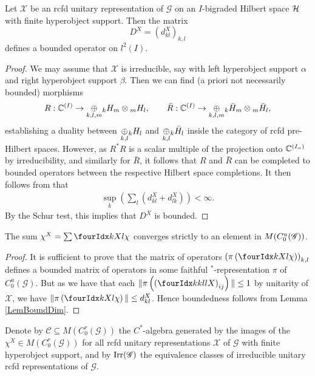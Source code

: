  \begin{Lem} \label{LemBoundDim} Let $\mathscr{X}$ be an rcfd unitary
   representation of $\mathscr{G}$ on an $I$-bigraded Hilbert space $\Hsp$ with finite hyperobject support. Then the matrix \[D^X = (d^X_{kl})_{k,l}\] defines a bounded operator on $l^2(I)$. 
  \end{Lem}
  \begin{proof} We may assume that $\mathscr{X}$ is irreducible, say
    with left hyperobject support $\alpha$ and right hyperobject support
    $\beta$. Then we can find (a priori not necessarily bounded)
    morphisms \[R: \C^{(I)}\rightarrow \underset{k,l,m}{\oplus} \GrDA{H}{k}{m}\otimes
    \GrDA{H}{m}{l},\qquad \bar{R}: \C^{(I)} \rightarrow \underset{k,l,m}{\oplus}
    \GrDA{\bar{H}}{k}{m}\otimes \GrDA{\bar{H}}{m}{l},\] establishing a
    duality between $\underset{k,l}{\oplus} \GrDA{H}{k}{l}$ and
    $\underset{k,l}{\oplus}\GrDA{\bar{H}}{k}{l}$ inside the category of
    rcfd pre-Hilbert spaces. However, as $R^*R$ is a scalar multiple
    of the projection onto $\C^{(I_{\alpha})}$ by irreducibility, and
    similarly for $\bar{R}$, it follows that $R$ and $\bar{R}$ can be
    completed to bounded operators between the respective Hilbert
    space completions. It then follows from \cite[Lemma A.3.2]{DCY1}
    that 
    \begin{align} \label{eq:dim-estimate}
  \sup_k (\sum_l (d_{kl}^X+d_{lk}^X)) < \infty.    
    \end{align}
 By the Schur test,
    this implies that $D^X$ is bounded.
\end{proof} 


   
\begin{Lem} The sum $\chi^X  =\sum \Gr{\chi}{}{X}{k}{l}$ converges strictly to an element in $M(\CuG)$. 
\end{Lem} 
 
\begin{proof} It is sufficient to prove that the matrix of operators $\left(\pi\left(\Gr{\chi}{}{X}{k}{l}\right)\right)_{k,l}$ defines a bounded matrix of operators in some faithful $^*$-representation $\pi$ of $C^{u}_{0}(\mathscr{G})$. But as we have that each $\|\pi\left(\left(\Gr{X}{k}{l}{k}{l}\right)_{ij}\right)\|\leq 1$ by unitarity of $\mathscr{X}$, we have $\| \pi\left(\Gr{\chi}{}{X}{k}{l}\right)\| \leq d^X_{kl}$.  Hence boundedness follows from Lemma \ref{LemBoundDim}.
\end{proof} 

Denote by $\mathcal{C} \subseteq M(C_{0}^{r}(\mathscr{G}))$ the
$C^{*}$-algebra generated by the images of the $\chi^{X} \in
M(C_{0}^{r}(\mathscr{G}))$ for all rcfd unitary representations
$\mathscr{X}$ of $\mathscr{G}$ with finite hyperobject support, and by
 $\Irr(\mathscr{G})$ the equivalence classes of irreducible
unitary rcfd representations of $\mathscr{G}$.

